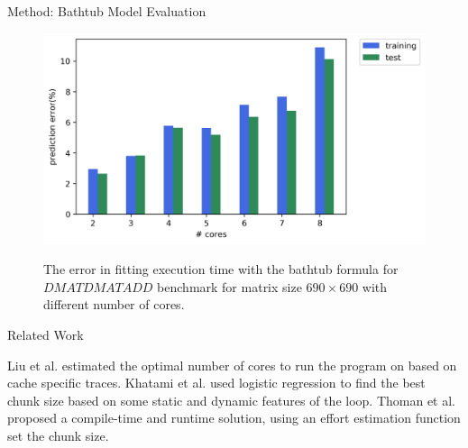 \documentclass[10pt]{beamer}
\begin{document}
\begin{frame}{Method: Bathtub Model Evaluation}
	\begin{outline}	
		\begin{figure}[H]
			\centering
			{\includegraphics[scale=.45]{images/bathtub/error_690.png}}	
			\caption{The error in fitting execution time with the bathtub formula for $DMATDMATADD$ benchmark for matrix size $690\times690$ with different number of cores.}	
			\label{fig34}
		\end{figure}
	\end{outline}
\end{frame}


	\begin{frame}{Related Work}
		\begin{outline}
			\1Liu et al. estimated the optimal number of cores to run the program on based on cache specific traces. 
			\1Khatami et al. used logistic regression to find the best chunk size based on some static and dynamic features of the loop.		
			\1Thoman et al. proposed a compile-time and runtime solution, using an effort estimation function set the chunk size. 
		\end{outline}
\end{frame}
\end{document}
